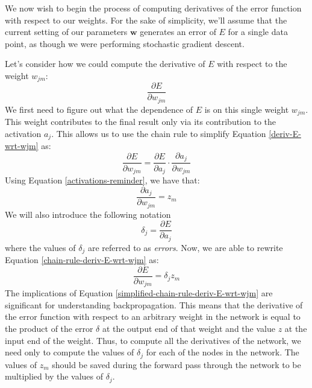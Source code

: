 We now wish to begin the process of computing derivatives of the error function with respect to our weights. For the sake of simplicity, we'll assume that the current setting of our parameters $\textbf{w}$ generates an error of $E$ for a single data point, as though we were performing stochastic gradient descent.

Let's consider how we could compute the derivative of $E$ with respect to the weight $w_{jm}$:
\begin{equation} \label{deriv-E-wrt-wjm}
	\frac{\partial E}{\partial w_{jm}}
\end{equation}
We first need to figure out what the dependence of $E$ is on this single weight $w_{jm}$. This weight contributes to the final result only via its contribution to the activation $a_{j}$. This allows us to use the chain rule to simplify Equation \ref{deriv-E-wrt-wjm} as:
\begin{equation} \label{chain-rule-deriv-E-wrt-wjm}
	\frac{\partial E}{\partial w_{jm}} = \frac{\partial E}{\partial a_{j}} \cdot \frac{\partial a_{j}}{\partial w_{jm}}
\end{equation}
Using Equation \ref{activations-reminder}, we have that:
\begin{equation*}
	\frac{\partial a_{j}}{\partial w_{jm}} = z_{m}
\end{equation*}
We will also introduce the following notation
\begin{equation} \label{delta-expression}
	\delta_{j} = \frac{\partial E}{\partial a_{j}}
\end{equation}
where the values of $\delta_{j}$ are referred to as \textit{errors}. Now, we are able to rewrite Equation \ref{chain-rule-deriv-E-wrt-wjm} as:
\begin{equation} \label{simplified-chain-rule-deriv-E-wrt-wjm}
	\frac{\partial E}{\partial w_{jm}} = \delta_{j} z_{m}
\end{equation}
The implications of Equation \ref{simplified-chain-rule-deriv-E-wrt-wjm} are significant for understanding backpropagation. This means that the derivative of the error function with respect to an arbitrary weight in the network is equal to the product of the error $\delta$ at the output end of that weight and the value $z$ at the input end of the weight. Thus, to compute all the derivatives of the network, we need only to compute the values of $\delta_{j}$ for each of the nodes in the network. The values of $z_{m}$ should be saved during the forward pass through the network to be multiplied by the values of $\delta_{j}$.

